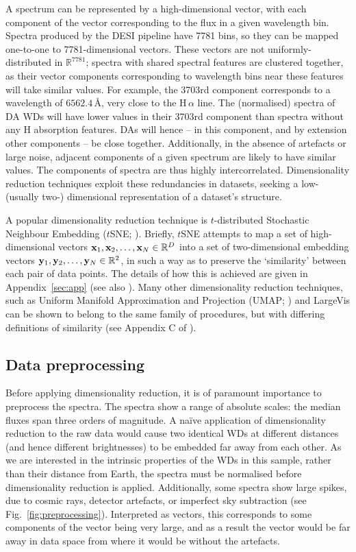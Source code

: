 \documentclass[fleqn,usenatbib]{mnras}
\def\xb{\vb{x}}
\def\yb{\vb{y}}
\begin{document}
A spectrum can be represented by a high-dimensional vector, with each component of the vector corresponding to the flux in a given wavelength bin.
Spectra produced by the DESI pipeline have 7781 bins, so they can be mapped one-to-one to 7781-dimensional vectors.
These vectors are not uniformly-distributed in $\mathbb{R}^{7781}$;
spectra with shared spectral features are clustered together, as their vector components corresponding to wavelength bins near these features will take similar values.
For example, the 3703rd component corresponds to a wavelength of $6562.4\,\text{\AA}$, very close to the H$\,\alpha$ line.
The (normalised) spectra of DA WDs will have lower values in their 3703rd component than spectra without any H absorption features.
DAs will hence -- in this component, and by extension other components -- be close together.
Additionally, in the absence of artefacts or large noise, adjacent components of a given spectrum are likely to have similar values.
The components of spectra are thus highly intercorrelated.
Dimensionality reduction techniques exploit these redundancies in datasets, seeking a low- (usually two-) dimensional representation of a dataset's structure.

A popular dimensionality reduction technique is $t$-distributed Stochastic Neighbour Embedding ($t$SNE; \citealt{tsne}).
Briefly, $t$SNE attempts to map a set of high-dimensional vectors $\xb_1, \xb_2, \dots, \xb_N \in \mathbb{R}^D$ into a set of two-dimensional embedding vectors $\yb_1, \yb_2, \dots, \yb_N \in \mathbb{R}^2$, in such a way as to preserve the `similarity' between each pair of data points.
The details of how this is achieved are given in Appendix~\ref{sec:app} (see also \citealt{tsne}).
Many other dimensionality reduction techniques, such as Uniform Manifold Approximation and Projection (UMAP; \citealt{umap}) and LargeVis \citep{largevis} can be shown to belong to the same family of procedures, but with differing definitions of similarity (see Appendix C of \citealt{umap}).


\subsection{Data preprocessing}
\label{sec:preprocessing}

Before applying dimensionality reduction, it is of paramount importance to preprocess the spectra.
The spectra show a range of absolute scales: the median fluxes span three orders of magnitude.
A na\"{i}ve application of dimensionality reduction to the raw data would cause two identical WDs at different distances (and hence different brightnesses) to be embedded far away from each other.
As we are interested in the intrinsic properties of the WDs in this sample, rather than their distance from Earth, the spectra must be normalised before dimensionality reduction is applied.
Additionally, some spectra show large spikes, due to cosmic rays, detector artefacts, or imperfect sky subtraction (see Fig.~\ref{fig:preprocessing}).
Interpreted as vectors, this corresponds to some components of the vector being very large, and as a result the vector would be far away in data space from where it would be without the artefacts.
\end{document}
